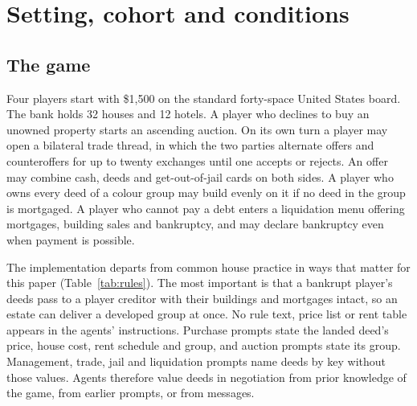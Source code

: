\section{Setting, cohort and conditions}
\label{sec:setup}

\subsection{The game}

Four players start with \$1,500 on the standard forty-space United States board. The bank holds 32 houses and 12 hotels. A player who declines to buy an unowned property starts an ascending auction. On its own turn a player may open a bilateral trade thread, in which the two parties alternate offers and counteroffers for up to twenty exchanges until one accepts or rejects. An offer may combine cash, deeds and get-out-of-jail cards on both sides. A player who owns every deed of a colour group may build evenly on it if no deed in the group is mortgaged. A player who cannot pay a debt enters a liquidation menu offering mortgages, building sales and bankruptcy, and may declare bankruptcy even when payment is possible.

The implementation departs from common house practice in ways that matter for this paper (Table~\ref{tab:rules}). The most important is that a bankrupt player's deeds pass to a player creditor with their buildings and mortgages intact, so an estate can deliver a developed group at once. No rule text, price list or rent table appears in the agents' instructions. Purchase prompts state the landed deed's price, house cost, rent schedule and group, and auction prompts state its group. Management, trade, jail and liquidation prompts name deeds by key without those values. Agents therefore value deeds in negotiation from prior knowledge of the game, from earlier prompts, or from messages.

